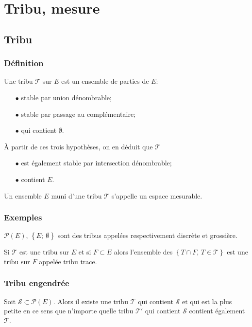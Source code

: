\section{Tribu, mesure}

\subsection{Tribu}

\subsubsection{Définition}

Une tribu $\mathcal{T}$ sur $E$ est un ensemble de parties de $E$:
\begin{itemize}
\item[$\bullet$] stable par union dénombrable;
\item[$\bullet$] stable par passage au complémentaire;
\item[$\bullet$] qui contient $\emptyset$.
\end{itemize}

À partir de ces trois hypothèses, on en déduit que $\mathcal{T}$ 
\begin{itemize}
\item[$\bullet$] est également stable par intersection dénombrable;
\item[$\bullet$] contient $E$.
\end{itemize}

Un ensemble $E$ muni d'une tribu $\mathcal{T}$ s'appelle un espace mesurable.

\subsubsection{Exemples}

$\mathcal{P}(E)$, $\left\{E;~\emptyset \right \}$ sont des tribus appelées respectivement discrète et grossière.

Si $\mathcal{T}$ est une tribu sur $E$ et si $F \subset E$ alors l'ensemble des $\left \{ T \cap F, \, T \in \mathcal{T}\right \}$ est une tribu sur $F$ appelée tribu trace.


\subsubsection{Tribu engendrée}

Soit $\mathcal{S} \subset \mathcal{P}(E)$. Alors il existe une tribu $\mathcal{T}$ qui contient $\mathcal{S}$ et qui est la plus petite en ce sens que n'importe quelle tribu $\mathcal{T'}$ qui contient $\mathcal{S}$ contient également $\mathcal{T}$.

